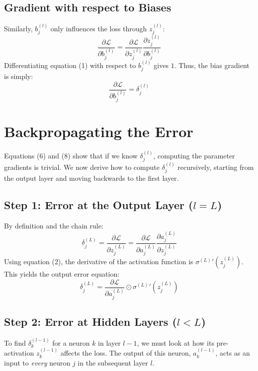 \documentclass[11pt, a4paper]{article}
\begin{document}
\subsection{Gradient with respect to Biases}
Similarly, $b_j^{(l)}$ only influences the loss through $z_j^{(l)}$:
\begin{equation}
    \frac{\partial \mathcal{L}}{\partial b_j^{(l)}} = \frac{\partial \mathcal{L}}{\partial z_j^{(l)}} \frac{\partial z_j^{(l)}}{\partial b_j^{(l)}}
\end{equation}
Differentiating equation (1) with respect to $b_j^{(l)}$ gives $1$. Thus, the bias gradient is simply:
\begin{equation}
    \frac{\partial \mathcal{L}}{\partial b_j^{(l)}} = \delta_j^{(l)}
\end{equation}

\section{Backpropagating the Error}

Equations (6) and (8) show that if we know $\delta_j^{(l)}$, computing the parameter gradients is trivial. We now derive how to compute $\delta_j^{(l)}$ recursively, starting from the output layer and moving backwards to the first layer.

\subsection{Step 1: Error at the Output Layer ($l=L$)}
By definition and the chain rule:
\begin{equation}
    \delta_j^{(L)} = \frac{\partial \mathcal{L}}{\partial z_j^{(L)}} = \frac{\partial \mathcal{L}}{\partial a_j^{(L)}} \frac{\partial a_j^{(L)}}{\partial z_j^{(L)}}
\end{equation}
Using equation (2), the derivative of the activation function is ${\sigma^{(L)}}'(z_j^{(L)})$. This yields the output error equation:
\begin{equation}
    \delta_j^{(L)} = \frac{\partial \mathcal{L}}{\partial a_j^{(L)}} \odot {\sigma^{(L)}}'(z_j^{(L)})
\end{equation}

\subsection{Step 2: Error at Hidden Layers ($l < L$)}
To find $\delta_k^{(l-1)}$ for a neuron $k$ in layer $l-1$, we must look at how its pre-activation $z_k^{(l-1)}$ affects the loss. The output of this neuron, $a_k^{(l-1)}$, acts as an input to \textit{every} neuron $j$ in the subsequent layer $l$. 
\end{document}
